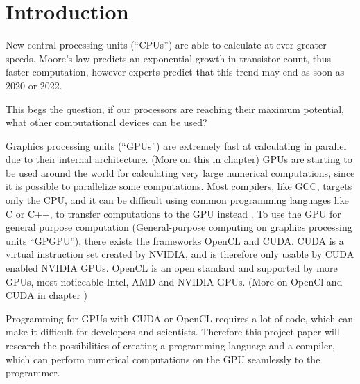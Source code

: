 \chapter{Introduction}\label{ch:introduction}

New central processing units (``CPUs'') are able to calculate at ever greater speeds.
Moore's law predicts an exponential growth in transistor count, thus faster computation, however experts predict that this trend may end as soon as 2020 or 2022. \citep{Moore2013}

This begs the question, if our processors are reaching their maximum potential, what other computational devices can be used?

Graphics processing units (``GPUs'') are extremely fast at calculating in parallel due to their internal architecture. (More on this in chapter)
GPUs are starting to be used around the world for calculating very large numerical computations, since it is possible to parallelize some computations.
Most compilers, like GCC, targets only the CPU, and it can be difficult using common programming languages like C or C++, to transfer computations to the GPU instead .
To use the GPU for general purpose computation (General-purpose computing on graphics processing units ``GPGPU''), there exists the frameworks OpenCL and CUDA.
CUDA is a virtual instruction set created by NVIDIA, and is therefore only usable by CUDA enabled NVIDIA GPUs.
OpenCL is an open standard and supported by more GPUs, most noticeable Intel, AMD and NVIDIA GPUs. (More on OpenCl and CUDA in chapter )

Programming for GPUs with CUDA or OpenCL requires a lot of code, which can make it difficult for developers and scientists.
Therefore this project paper will research the possibilities of creating a programming language and a compiler, which can perform numerical computations on the GPU seamlessly to the programmer. 
